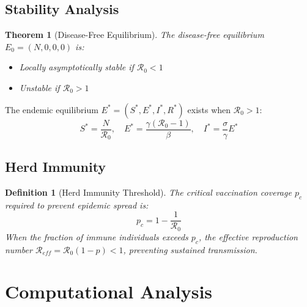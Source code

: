 \documentclass[a4paper, 11pt]{article}
\newtheorem{definition}{Definition}[section]
\newtheorem{theorem}{Theorem}[section]
\begin{document}
\subsection{Stability Analysis}

\begin{theorem}[Disease-Free Equilibrium]
The disease-free equilibrium $E_0 = (N, 0, 0, 0)$ is:
\begin{itemize}
\item Locally asymptotically stable if $\mathcal{R}_0 < 1$
\item Unstable if $\mathcal{R}_0 > 1$
\end{itemize}
\end{theorem}

The endemic equilibrium $E^* = (S^*, E^*, I^*, R^*)$ exists when $\mathcal{R}_0 > 1$:
\begin{equation}
S^* = \frac{N}{\mathcal{R}_0}, \quad E^* = \frac{\gamma(\mathcal{R}_0 - 1)}{\beta}, \quad I^* = \frac{\sigma}{\gamma} E^*
\end{equation}

\subsection{Herd Immunity}

\begin{definition}[Herd Immunity Threshold]
The critical vaccination coverage $p_c$ required to prevent epidemic spread is:
\begin{equation}
p_c = 1 - \frac{1}{\mathcal{R}_0}
\end{equation}
When the fraction of immune individuals exceeds $p_c$, the effective reproduction number
$\mathcal{R}_{eff} = \mathcal{R}_0(1-p) < 1$, preventing sustained transmission.
\end{definition}

\section{Computational Analysis}
\end{document}
